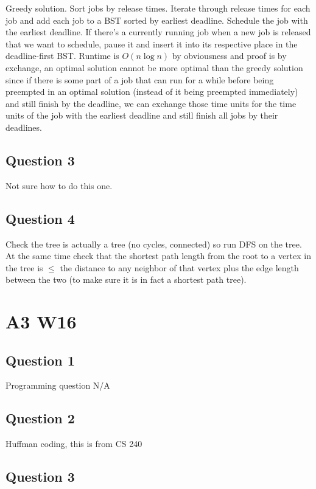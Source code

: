 \documentclass[11pt]{article}
\begin{document}
Greedy solution. Sort jobs by release times. Iterate through release times for each job and add each job to a BST sorted by earliest deadline. Schedule the job with the earliest deadline. If there's a currently running job when a new job is released that we want to schedule, pause it and insert it into its respective place in the deadline-first BST. Runtime is $O(n \log n)$ by obviousness and proof is by exchange, an optimal solution cannot be more optimal than the greedy solution since if there is some part of a job that can run for a while before being preempted in an optimal solution (instead of it being preempted immediately) and still finish by the deadline, we can exchange those time units for the time units of the job with the earliest deadline and still finish all jobs by their deadlines.

\subsection{Question 3}

Not sure how to do this one.

\subsection{Question 4}

Check the tree is actually a tree (no cycles, connected) so run DFS on the tree. At the same time check that the shortest path length from the root to a vertex in the tree is $\leq$ the distance to any neighbor of that vertex plus the edge length between the two (to make sure it is in fact a shortest path tree).

\section{A3 W16}

\subsection{Question 1}

Programming question N/A

\subsection{Question 2}

Huffman coding, this is from CS 240

\subsection{Question 3}
\end{document}
